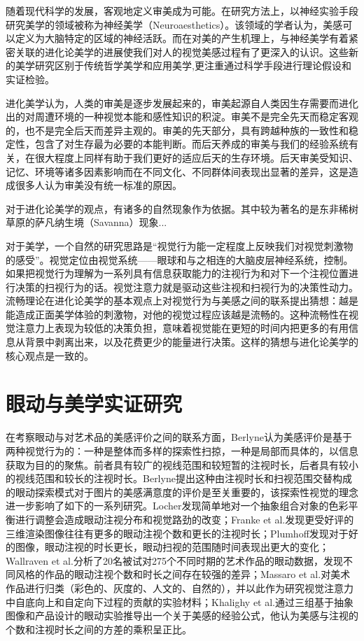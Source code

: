 随着现代科学的发展，客观地定义审美成为可能。在研究方法上，以神经实验手段研究美学的领域被称为神经美学（Neuroaesthetics）。该领域的学者认为，美感可以定义为大脑特定的区域的神经活跃。而在对美的产生机理上，与神经美学有着紧密关联的进化论美学的进展使我们对人的视觉美感过程有了更深入的认识。这些新的美学研究区别于传统哲学美学和应用美学,更注重通过科学手段进行理论假设和实证检验。

进化美学认为，人类的审美是逐步发展起来的，审美起源自人类因生存需要而进化出的对周遭环境的一种视觉本能和感性知识的积淀。审美不是完全先天而稳定客观的，也不是完全后天而差异主观的。审美的先天部分，具有跨越种族的一致性和稳定性，包含了对生存最为必要的本能判断。而后天养成的审美与我们的经验系统有关，在很大程度上同样有助于我们更好的适应后天的生存环境。后天审美受知识、记忆、环境等诸多因素影响而在不同文化、不同群体间表现出显著的差异，这是造成很多人认为审美没有统一标准的原因。

对于进化论美学的观点，有诸多的自然现象作为依据。其中较为著名的是东非稀树草原的萨凡纳生境（Savanna）现象...

对于美学，一个自然的研究思路是“视觉行为能一定程度上反映我们对视觉刺激物的感受”。视觉定位由视觉系统——眼球和与之相连的大脑皮层神经系统，控制。如果把视觉行为理解为一系列具有信息获取能力的注视行为和对下一个注视位置进行决策的扫视行为的话。视觉注意力就是驱动这些注视和扫视行为的决策性动力。流畅理论在进化论美学的基本观点上对视觉行为与美感之间的联系提出猜想：越是能造成正面美学体验的刺激物，对他的视觉过程应该越是流畅的。这种流畅性在视觉注意力上表现为较低的决策负担，意味着视觉能在更短的时间内把更多的有用信息从背景中剥离出来，以及花费更少的能量进行决策。这样的猜想与进化论美学的核心观点是一致的。

\section{眼动与美学实证研究}

在考察眼动与对艺术品的美感评价之间的联系方面，Berlyne认为美感评价是基于两种视觉行为的：一种是整体而多样的探索性扫掠，一种是局部而具体的，以信息获取为目的的聚焦。前者具有较广的视线范围和较短暂的注视时长，后者具有较小的视线范围和较长的注视时长。Berlyne提出这种由注视时长和扫视范围交替构成的眼动探索模式对于图片的美感满意度的评价是至关重要的，该探索性视觉的理念进一步影响了如下的一系列研究。Locher发现简单地对一个抽象组合对象的色彩平衡进行调整会造成眼动注视分布和视觉路劲的改变；Franke et al.发现更受好评的三维渲染图像往往有更多的眼动注视个数和更长的注视时长；Plumhoff发现对于好的图像，眼动注视的时长更长，眼动扫视的范围随时间表现出更大的变化；Wallraven et al.分析了20名被试对275个不同时期的艺术作品的眼动数据，发现不同风格的作品的眼动注视个数和时长之间存在较强的差异；Massaro et al.对美术作品进行归类（彩色的、灰度的、人文的、自然的），并以此作为研究视觉注意力中自底向上和自定向下过程的贡献的实验材料；Khalighy et al.通过三组基于抽象图像和产品设计的眼动实验推导出一个关于美感的经验公式，他认为美感与注视的个数和注视时长之间的方差的乘积呈正比。

